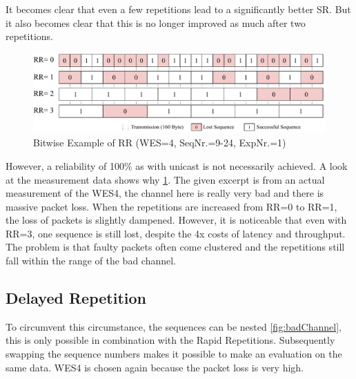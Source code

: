 It becomes clear that even a few repetitions lead to a significantly better SR.
But it also becomes clear that this is no longer improved as much after two repetitions.

\begin{figure}[h]
	\centering
	\includegraphics[scale=0.5]{figures/rrBitwise.pdf}
	\caption{Bitwise Example of RR (WES=4, SeqNr.=9-24, ExpNr.=1)}
	\label{fig:rrBitwise}
\end{figure}

However, a reliability of 100\% as with unicast is not necessarily achieved.
A look at the measurement data shows why \cref{fig:rrBitwise}.
The given excerpt is from an actual measurement of the WES4, 
the channel here is really very bad and there is massive packet loss.
When the repetitions are increased from RR=0 to RR=1, the loss of packets is slightly dampened.
However, it is noticeable that even with RR=3,
one sequence is still lost, despite the 4x costs of latency and throughput.
The problem is that faulty packets often come clustered 
and the repetitions still fall within the range of the bad channel.

\subsection*{Delayed Repetition}

To circumvent this circumstance, the sequences can be nested \cref{fig:badChannel},
this is only possible in combination with the Rapid Repetitions.
Subsequently swapping the sequence numbers makes it possible to make an evaluation on the same data.
WES4 is chosen again because the packet loss is very high.

